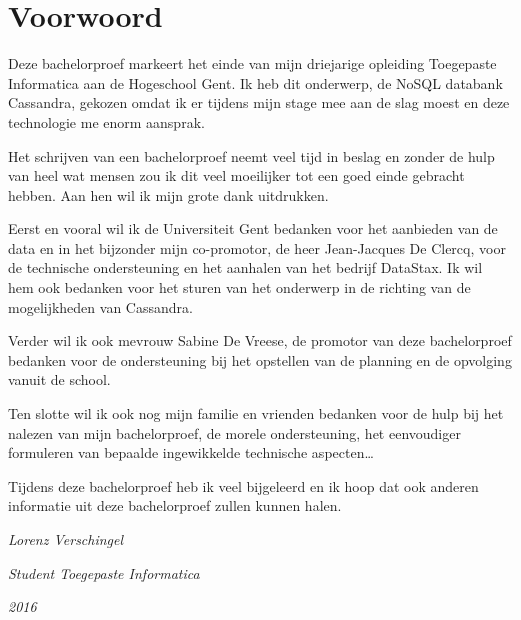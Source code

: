 \chapter*{Voorwoord}
\label{ch:voorwoord}

Deze bachelorproef markeert het einde van mijn driejarige opleiding Toegepaste Informatica aan de Hogeschool Gent.
Ik heb dit onderwerp, de NoSQL databank Cassandra, gekozen omdat ik er tijdens mijn stage mee aan de slag moest en deze technologie me enorm aansprak.

Het schrijven van een bachelorproef neemt veel tijd in beslag en zonder de hulp van heel wat mensen zou ik dit veel moeilijker tot een goed einde gebracht hebben.
Aan hen wil ik mijn grote dank uitdrukken.

Eerst en vooral wil ik de Universiteit Gent bedanken voor het aanbieden van de data en in het bijzonder mijn co-promotor, de heer Jean-Jacques De Clercq, voor de technische ondersteuning en het aanhalen van het bedrijf DataStax.
Ik wil hem ook bedanken voor het sturen van het onderwerp in de richting van de mogelijkheden van Cassandra.

Verder wil ik ook mevrouw Sabine De Vreese, de promotor van deze bachelorproef bedanken voor de ondersteuning bij het opstellen van de planning en de opvolging vanuit de school.

Ten slotte wil ik ook nog mijn familie en vrienden bedanken voor de hulp bij het nalezen van mijn bachelorproef, de morele ondersteuning, het eenvoudiger formuleren van bepaalde ingewikkelde technische aspecten\dots

Tijdens deze bachelorproef heb ik veel bijgeleerd en ik hoop dat ook anderen informatie uit deze bachelorproef zullen kunnen halen.

\vspace{4 em}

\begin{flushright}
	\textit{Lorenz Verschingel}	
\end{flushright}
\begin{flushright}
	\textit{Student Toegepaste Informatica}
\end{flushright}
\begin{flushright}
	\textit{2016}
\end{flushright}